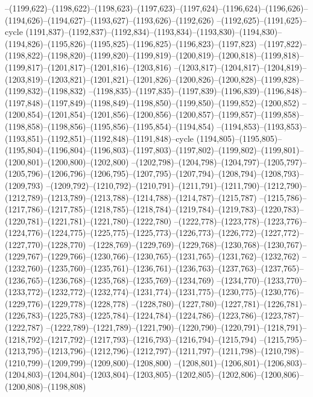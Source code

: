 --(1199,622)--(1198,622)--(1198,623)--(1197,623)--(1197,624)--(1196,624)--(1196,626)--(1194,626)--(1194,627)--(1193,627)--(1193,626)--(1192,626)
--(1192,625)--(1191,625)--cycle
(1191,837)--(1192,837)--(1192,834)--(1193,834)--(1193,830)--(1194,830)--(1194,826)--(1195,826)--(1195,825)--(1196,825)--(1196,823)--(1197,823)
--(1197,822)--(1198,822)--(1198,820)--(1199,820)--(1199,819)--(1200,819)--(1200,818)--(1199,818)--(1199,817)--(1201,817)--(1201,816)--(1203,816)
--(1203,817)--(1204,817)--(1204,819)--(1203,819)--(1203,821)--(1201,821)--(1201,826)--(1200,826)--(1200,828)--(1199,828)--(1199,832)--(1198,832)
--(1198,835)--(1197,835)--(1197,839)--(1196,839)--(1196,848)--(1197,848)--(1197,849)--(1198,849)--(1198,850)--(1199,850)--(1199,852)--(1200,852)
--(1200,854)--(1201,854)--(1201,856)--(1200,856)--(1200,857)--(1199,857)--(1199,858)--(1198,858)--(1198,856)--(1195,856)--(1195,854)--(1194,854)
--(1194,853)--(1193,853)--(1193,851)--(1192,851)--(1192,848)--(1191,848)--cycle
(1194,805)--(1195,805)--(1195,804)--(1196,804)--(1196,803)--(1197,803)--(1197,802)--(1199,802)--(1199,801)--(1200,801)--(1200,800)--(1202,800)
--(1202,798)--(1204,798)--(1204,797)--(1205,797)--(1205,796)--(1206,796)--(1206,795)--(1207,795)--(1207,794)--(1208,794)--(1208,793)--(1209,793)
--(1209,792)--(1210,792)--(1210,791)--(1211,791)--(1211,790)--(1212,790)--(1212,789)--(1213,789)--(1213,788)--(1214,788)--(1214,787)--(1215,787)
--(1215,786)--(1217,786)--(1217,785)--(1218,785)--(1218,784)--(1219,784)--(1219,783)--(1220,783)--(1220,781)--(1221,781)--(1221,780)--(1222,780)
--(1222,778)--(1223,778)--(1223,776)--(1224,776)--(1224,775)--(1225,775)--(1225,773)--(1226,773)--(1226,772)--(1227,772)--(1227,770)--(1228,770)
--(1228,769)--(1229,769)--(1229,768)--(1230,768)--(1230,767)--(1229,767)--(1229,766)--(1230,766)--(1230,765)--(1231,765)--(1231,762)--(1232,762)
--(1232,760)--(1235,760)--(1235,761)--(1236,761)--(1236,763)--(1237,763)--(1237,765)--(1236,765)--(1236,768)--(1235,768)--(1235,769)--(1234,769)
--(1234,770)--(1233,770)--(1233,772)--(1232,772)--(1232,774)--(1231,774)--(1231,775)--(1230,775)--(1230,776)--(1229,776)--(1229,778)--(1228,778)
--(1228,780)--(1227,780)--(1227,781)--(1226,781)--(1226,783)--(1225,783)--(1225,784)--(1224,784)--(1224,786)--(1223,786)--(1223,787)--(1222,787)
--(1222,789)--(1221,789)--(1221,790)--(1220,790)--(1220,791)--(1218,791)--(1218,792)--(1217,792)--(1217,793)--(1216,793)--(1216,794)--(1215,794)
--(1215,795)--(1213,795)--(1213,796)--(1212,796)--(1212,797)--(1211,797)--(1211,798)--(1210,798)--(1210,799)--(1209,799)--(1209,800)--(1208,800)
--(1208,801)--(1206,801)--(1206,803)--(1204,803)--(1204,804)--(1203,804)--(1203,805)--(1202,805)--(1202,806)--(1200,806)--(1200,808)--(1198,808)
